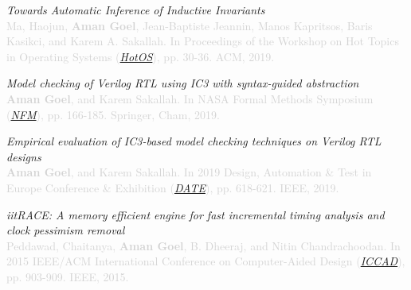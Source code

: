 \documentclass[margin,line,letter]{resume}
\begin{document}
\begin{resume}
\hspace{-2em} \href{https://dl.acm.org/citation.cfm?id=3321451}{\faFilePdfO} \hspace{0.3em}
\textit{Towards Automatic Inference of Inductive Invariants} \\
\textcolor{lightgray}{Ma, Haojun, \textbf{Aman Goel}, Jean-Baptiste Jeannin, Manos Kapritsos, Baris Kasikci, and Karem A. Sakallah. In Proceedings of the Workshop on Hot Topics in Operating Systems (\href{https://hotos19.sigops.org/}{\textit{HotOS}}), pp. 30-36. ACM, 2019.}

\hspace{-2em} \href{https://link.springer.com/chapter/10.1007/978-3-030-20652-9_11}{\faFilePdfO} \hspace{0.3em}
\textit{Model checking of Verilog RTL using IC3 with syntax-guided abstraction} \\
\textcolor{lightgray}{\textbf{Aman Goel}, and Karem Sakallah. In NASA Formal Methods Symposium (\href{https://robonaut.jsc.nasa.gov/R2/pages/nfm2019.html}{\textit{NFM}}), pp. 166-185. Springer, Cham, 2019.}

\hspace{-2em} \href{https://ieeexplore.ieee.org/abstract/document/8715289}{\faFilePdfO} \hspace{0.3em}
\textit{Empirical evaluation of IC3-based model checking techniques on Verilog RTL designs} \\
\textcolor{lightgray}{\textbf{Aman Goel}, and Karem Sakallah. In 2019 Design, Automation \& Test in Europe Conference \& Exhibition (\href{https://www.date-conference.com/}{\textit{DATE}}), pp. 618-621. IEEE, 2019.}

\hspace{-2em} \href{https://ieeexplore.ieee.org/abstract/document/7372667}{\faFilePdfO} \hspace{0.3em}
\textit{iitRACE: A memory efficient engine for fast incremental timing analysis and clock pessimism removal} \\
\textcolor{lightgray}{Peddawad, Chaitanya, \textbf{Aman Goel}, B. Dheeraj, and Nitin Chandrachoodan. In 2015 IEEE/ACM International Conference on Computer-Aided Design (\href{https://iccad.com/}{\textit{ICCAD}}), pp. 903-909. IEEE, 2015.}


\end{resume}
\end{document}
